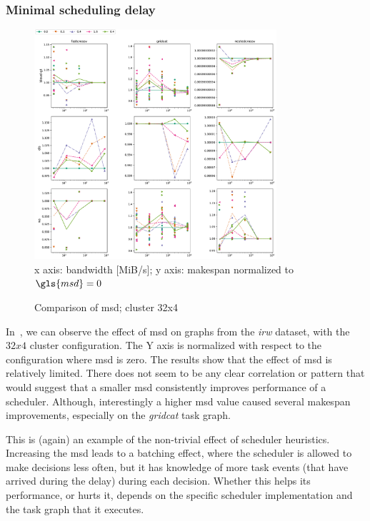 \subsubsection*{Minimal scheduling delay}

\begin{figure}
	\centering
	\includegraphics[width=0.8\textwidth]{imgs/estee/charts/irw-32x4-schedtime-score}\\
	{\small x axis: bandwidth [MiB/s]; y axis: makespan normalized to
	$\gls{msd}=0$}
	\caption{Comparison of \gls{msd}; cluster 32x4}
	\label{fig:estee-chart-irw-msd}
\end{figure}

In~, we can observe the effect of \gls{msd} on graphs from the
\emph{irw} dataset, with the $32x4$ cluster configuration. The Y axis
is normalized with respect to the configuration where \gls{msd} is zero. The results
show that the effect of \gls{msd} is relatively limited. There does not seem to be
any clear correlation or pattern that would suggest that a smaller \gls{msd}
consistently improves performance of a scheduler. Although, interestingly a higher
\gls{msd} value caused several makespan improvements, especially on the
\emph{gridcat} task graph.

This is (again) an example of the non-trivial effect of scheduler heuristics. Increasing the
\gls{msd} leads to a batching effect, where the scheduler is allowed to make
decisions less often, but it has knowledge of more task events (that have arrived during the delay)
during each decision. Whether this helps its performance, or hurts it, depends on the specific
scheduler implementation and the task graph that it executes.


